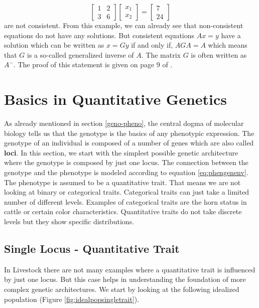 \documentclass[]{book}
\theoremstyle{definition}
\theoremstyle{definition}
\theoremstyle{definition}
\theoremstyle{remark}
\begin{document}
\[
\left[
\begin{array}{cc}
1  &  2  \\
3  &  6
\end{array}\right]
\left[
\begin{array}{c}
x_1  \\
x_2
\end{array}\right]
=
\left[
\begin{array}{c}
7  \\
24
\end{array}\right]
\]
are not consistent. From this example, we can already see that non-consistent equations do not have any solutions. But consistent equations \(Ax = y\) have a solution which can be written as \(x = Gy\) if and only if, \(AGA = A\) which means that \(G\) is a so-called generalized inverse of \(A\). The matrix \(G\) is often written as \(A^-\). The proof of this statement is given on page 9 of \citep{Searle1971}.

\hypertarget{quan-gen}{%
\chapter{Basics in Quantitative Genetics}\label{quan-gen}}

As already mentioned in section \ref{geno-pheno}, the central dogma of molecular biology tells us that the genotype is the basics of any phenotypic expression. The genotype of an individual is composed of a number of genes which are also called \textbf{loci}. In this section, we start with the simplest possible genetic architecture where the genotype is composed by just one locus. The connection between the genotype and the phenotype is modeled according to equation \eqref{eq:phengenenv}. The phenotype is assumed to be a quantitative trait. That means we are not looking at binary or categorical traits. Categorical traits can just take a limited number of different levels. Examples of categorical traits are the horn status in cattle or certain color characteristics. Quantitative traits do not take discrete levels but they show specific distributions.

\hypertarget{single-locus-quant-trait}{%
\section{Single Locus - Quantitative Trait}\label{single-locus-quant-trait}}

In Livestock there are not many examples where a quantitative trait is influenced by just one locus. But this case helps in understanding the foundation of more complex genetic architectures. We start by looking at the following idealized population (Figure \ref{fig:idealpopsingletrait}).
\end{document}
